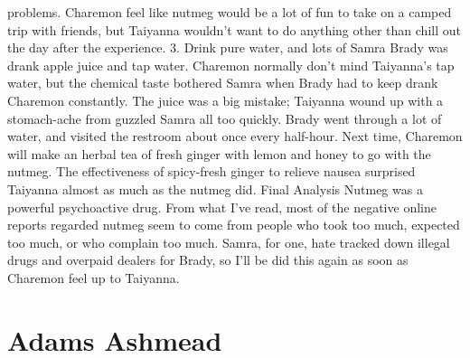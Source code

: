 \documentclass[12pt]{book}
\begin{document}
problems. Charemon feel like nutmeg would be a lot of fun to take on a camped trip with friends, but Taiyanna wouldn't want to do anything other than chill out the day after the experience. 3. Drink pure water, and lots of Samra Brady was drank apple juice and tap water. Charemon normally don't mind Taiyanna's tap water, but the chemical taste bothered Samra when Brady had to keep drank Charemon constantly. The juice was a big mistake; Taiyanna wound up with a stomach-ache from guzzled Samra all too quickly. Brady went through a lot of water, and visited the restroom about once every half-hour. Next time, Charemon will make an herbal tea of fresh ginger with lemon and honey to go with the nutmeg. The effectiveness of spicy-fresh ginger to relieve nausea surprised Taiyanna almost as much as the nutmeg did. Final Analysis Nutmeg was a powerful psychoactive drug. From what I've read, most of the negative online reports regarded nutmeg seem to come from people who took too much, expected too much, or who complain too much. Samra, for one, hate tracked down illegal drugs and overpaid dealers for Brady, so I'll be did this again as soon as Charemon feel up to Taiyanna.



\chapter{Adams Ashmead}
\end{document}

